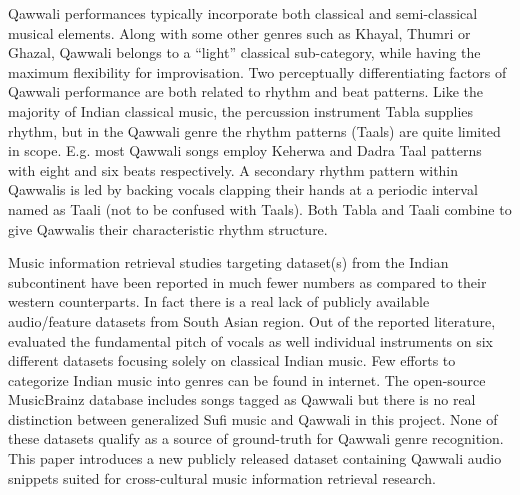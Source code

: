 \documentclass{article}
\begin{document}
Qawwali performances typically incorporate both classical and semi-classical musical elements.
Along with some other genres such as Khayal, Thumri or Ghazal, Qawwali belongs to a “light” classical \citep{qureshi1986sufi} sub-category, while having the maximum flexibility for improvisation. Two perceptually differentiating factors of Qawwali performance are both related to rhythm and beat patterns. Like the majority of Indian classical music, the percussion instrument Tabla supplies rhythm, but in the Qawwali genre the rhythm patterns (Taals) are quite limited in scope. E.g. most Qawwali songs employ Keherwa and Dadra Taal patterns with eight and six beats respectively. A secondary rhythm pattern within Qawwalis is led by backing vocals clapping their hands at a periodic interval named as Taali (not to be confused with Taals). Both Tabla and Taali combine to give Qawwalis their characteristic rhythm structure.

Music information retrieval studies targeting dataset(s) from the Indian subcontinent have been reported in much fewer numbers as compared to their western counterparts. In fact there is a real lack of publicly available audio/feature datasets from South Asian region. Out of the reported literature, \citep{carnatic_dataset} evaluated the fundamental pitch of vocals as well individual instruments on six different datasets focusing solely on classical Indian music. Few efforts to categorize Indian music into genres can be found in internet. The open-source MusicBrainz database includes songs tagged as Qawwali but there is no real distinction between generalized Sufi music and Qawwali in this project. None of these datasets qualify as a source of ground-truth for Qawwali genre recognition. This paper introduces a new publicly released dataset containing Qawwali audio snippets suited for cross-cultural music information retrieval research.
\end{document}
